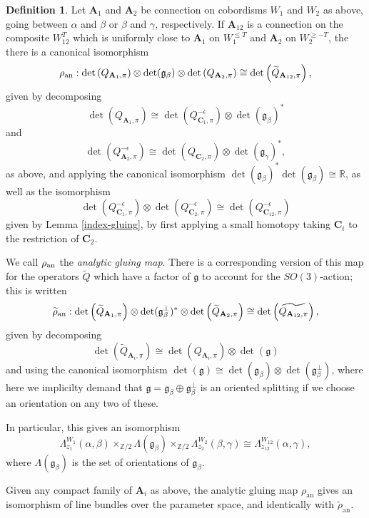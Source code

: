 \documentclass[10pt,a4paper]{amsart}
\theoremstyle{definition}
\newtheorem{definition}[theorem]{Definition}
\theoremstyle{remark}
\numberwithin{figure}{qchap}
\begin{document}
\begin{definition}\label{analytic-gluing}Let $\mathbf{A}_1$ and $\mathbf{A}_2$ be connection on cobordisms $W_1$ and $W_2$ as above, going between $\alpha$ and $\beta$ or $\beta$ and $\gamma$, respectively. If $\mathbf{A}_{12}$ is a connection on the composite $W_{12}^T$ which is uniformly close to $\mathbf{A}_1$ on $W_1^{\leq T}$ and $\mathbf{A}_2$ on $W_2^{\geq -T}$, the there is a canonical isomorphism $$\rho_{\textup{an}}: \det\left({Q_{\mathbf{A}_1, \pi}}\right) \otimes \det(\mathfrak g_\beta) \otimes \det\left(Q_{\mathbf{A}_2, \pi}\right) \cong \det\left(\widetilde{Q}_{\mathbf{A}_{12}, \pi}\right),$$ given by decomposing $$\det\left({Q_{\mathbf{A}_1, \pi}}\right) \cong \det\left({Q^{-\epsilon}_{\mathbf{C}_1, \pi}}\right) \otimes \det(\mathfrak g_\beta)^*$$ and $$\det\left({Q^{-\epsilon}_{\mathbf{A}_2, \pi}}\right) \cong \det\left({Q_{\mathbf{C}_2, \pi}}\right) \otimes \det(\mathfrak g_\gamma)^*,$$ as above, and applying the canonical isomorphism $\det(\mathfrak g_\beta)^* \det(\mathfrak g_\beta) \cong \mathbb R$, as well as the isomorphism $$\det\left({Q^{-\epsilon}_{\mathbf{C}_1, \pi}}\right) \otimes \det\left({Q^{-\epsilon}_{\mathbf{C}_2, \pi}}\right) \cong \det\left({Q^{-\epsilon}_{\mathbf{C}_{12}, \pi}}\right)$$ given by Lemma \ref{index-gluing}, by first applying a small homotopy taking $\mathbf{C}_i$ to the restriction of $\mathbf{C}_2$.

We call $\rho_{\textup{an}}$ the \emph{analytic gluing map}. There is a corresponding version of this map for the operators $\widetilde Q$ which have a factor of $\mathfrak g$ to account for the $SO(3)$-action; this is written
$$\widetilde \rho_{\textup{an}}: \det\left(\widetilde{Q}_{\mathbf{A}_1, \pi}\right) \otimes \det(\mathfrak g_\beta^\perp)^* \otimes \det\left(\widetilde{Q}_{\mathbf{A}_2, \pi}\right) \cong \det\left(\widetilde{Q_{\mathbf{A}_{12}, \pi}}\right),$$ given by decomposing $$\det\left(\widetilde{Q}_{\mathbf{A}_i, \pi}\right) \cong \det\left(Q_{\mathbf{A}_i, \pi}\right) \otimes \det(\mathfrak g)$$ and using the canonical isomorphism $\det(\mathfrak g) \cong \det(\mathfrak g_\beta) \otimes \det(\mathfrak g_\beta^\perp)$, where here we implicilty demand that $\mathfrak g = \mathfrak g_\beta \oplus \mathfrak g_\beta^\perp$ is an oriented splitting if we choose an orientation on any two of these.

In particular, this gives an isomorphism $$\Lambda^{W_1}_{z_1}(\alpha, \beta) \times_{\mathbb Z/2} \Lambda(\mathfrak g_\beta) \times_{\mathbb Z/2} \Lambda^{W_2}_{z_2}(\beta, \gamma) \cong \Lambda^{W_{12}}_{z_{12}}(\alpha, \gamma),$$ where $\Lambda(\mathfrak g_\beta)$ is the set of orientations of $\mathfrak g_\beta$.

Given any compact family of $\mathbf{A}_i$ as above, the analytic gluing map $\rho_{\text{an}}$ gives an isomorphism of line bundles over the parameter space, and identically with $\widetilde{\rho}_{\text{an}}$.
\end{definition}
\end{document}
